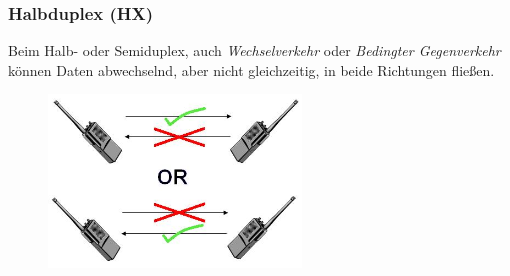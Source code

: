 \begin{frame}
  \frametitle{Halbduplex (HX)}

  Beim Halb- oder Semiduplex, auch \emph{Wechselverkehr} oder \emph{Bedingter
  Gegenverkehr} können Daten abwechselnd, aber nicht gleichzeitig, in beide
  Richtungen fließen.

  \begin{center}
    \begin{figure}
      \includegraphics[width=0.6\textwidth,height=.6\textheight,keepaspectratio]{bv11/HalfDuplex.jpg}
    \end{figure}
  \end{center}

\end{frame}

